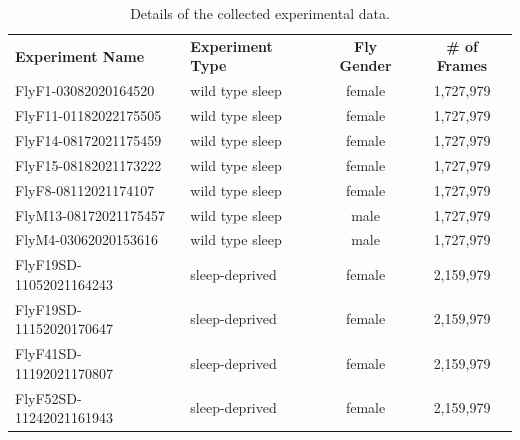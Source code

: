 \begin{table}[htb!]
	\begin{adjustbox}{width=1\textwidth}
		\begin{tabular}{l l c c}
			\toprule
			\multicolumn{1}{l}{\textbf{Experiment Name}} & \multicolumn{1}{l}{\textbf{Experiment Type}} & \multicolumn{1}{c}{\textbf{Fly Gender}} & \multicolumn{1}{c}{\textbf{\# of Frames}} \\
			\cmidrule(lr){1-1}\cmidrule(lr){2-2}\cmidrule(lr){3-3}\cmidrule(lr){4-4}
			FlyF1-03082020164520                         & wild type sleep                              & female                                  & 1,727,979                                 \\
			FlyF11-01182022175505                        & wild type sleep                              & female                                  & 1,727,979                                 \\
			FlyF14-08172021175459                        & wild type sleep                              & female                                  & 1,727,979                                 \\
			FlyF15-08182021173222                        & wild type sleep                              & female                                  & 1,727,979                                 \\
			FlyF8-08112021174107                         & wild type sleep                              & female                                  & 1,727,979                                 \\
			FlyM13-08172021175457                        & wild type sleep                              & male                                    & 1,727,979                                 \\
			FlyM4-03062020153616                         & wild type sleep                              & male                                    & 1,727,979                                 \\
			FlyF19SD-11052021164243                      & sleep-deprived                               & female                                  & 2,159,979                                 \\
			FlyF19SD-11152020170647                      & sleep-deprived                               & female                                  & 2,159,979                                 \\
			FlyF41SD-11192021170807                      & sleep-deprived                               & female                                  & 2,159,979                                 \\
			FlyF52SD-11242021161943                      & sleep-deprived                               & female                                  & 2,159,979                                 \\
			\bottomrule
		\end{tabular}
	\end{adjustbox}
	\caption{Details of the collected experimental data. \label{table:experiment-details}}
\end{table}

